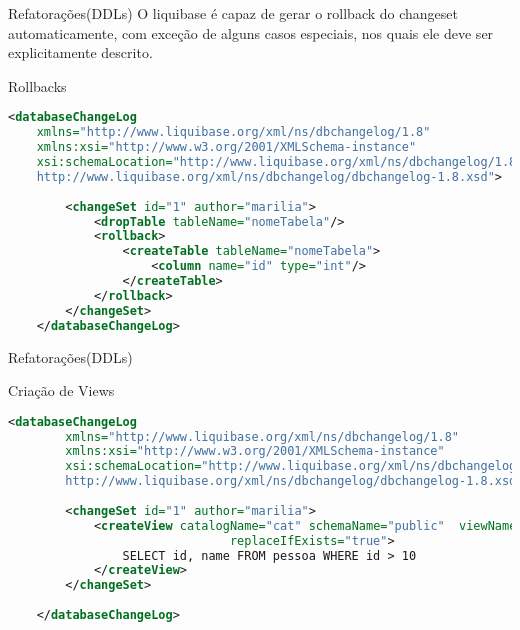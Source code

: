 \begin{frame}[fragile]{Refatorações(DDLs)}
O liquibase é capaz de gerar o rollback do changeset automaticamente, com exceção de alguns casos especiais, nos quais ele deve ser explicitamente descrito.
\begin{block}{Rollbacks}
    \begin{lstlisting}[language=XML]
    <databaseChangeLog
    xmlns="http://www.liquibase.org/xml/ns/dbchangelog/1.8"
    xmlns:xsi="http://www.w3.org/2001/XMLSchema-instance"
    xsi:schemaLocation="http://www.liquibase.org/xml/ns/dbchangelog/1.8
    http://www.liquibase.org/xml/ns/dbchangelog/dbchangelog-1.8.xsd">
    
        <changeSet id="1" author="marilia">
            <dropTable tableName="nomeTabela"/>
            <rollback>
                <createTable tableName="nomeTabela">
                    <column name="id" type="int"/>
                </createTable>
            </rollback>
        </changeSet>
    </databaseChangeLog>
    \end{lstlisting}
\end{block}
\end{frame}

\begin{frame}[fragile]{Refatorações(DDLs)}
\begin{block}{Criação de Views}
    \begin{lstlisting}[language=XML]
    <databaseChangeLog
        xmlns="http://www.liquibase.org/xml/ns/dbchangelog/1.8"
        xmlns:xsi="http://www.w3.org/2001/XMLSchema-instance"
        xsi:schemaLocation="http://www.liquibase.org/xml/ns/dbchangelog/1.8
        http://www.liquibase.org/xml/ns/dbchangelog/dbchangelog-1.8.xsd">
        
        <changeSet id="1" author="marilia">
            <createView catalogName="cat" schemaName="public"  viewName="vi_pessoa"
                               replaceIfExists="true">
                SELECT id, name FROM pessoa WHERE id > 10
            </createView>
        </changeSet>
         
    </databaseChangeLog>
    \end{lstlisting}
\end{block}
\end{frame}

